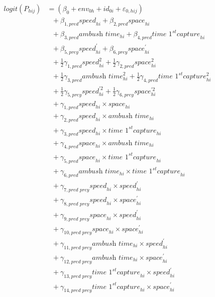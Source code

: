 \documentclass[
  11pt,
]{article}
\begin{document}
\[
\begin{aligned}
logit (P_{hij}) &= (\beta_{0} + env_{0h} + id_{0i} + \varepsilon_{0,hij}) \\
&\text{ } + \beta_{1,pred} \textit{speed}_{hi} + \beta_{2,pred} \textit{space}_{hi} \\
&\text{ } + \beta_{3,pred} \textit{ambush time}_{hi} + \beta_{4,pred} \textit{time 1}^{st} \textit{capture}_{hi} \\
&\text{ } + \beta_{5,prey} \textit{speed}_{hi}^{'} + \beta_{6,prey} \textit{space}_{hi}^{'} \\
&\text{ } + \frac{1}{2} \gamma_{1,pred} \textit{speed}_{hi}^{2} + \frac{1}{2} \gamma_{2,pred} \textit{space}_{hi}^{2} \\
&\text{ } + \frac{1}{2} \gamma_{3,pred} \textit{ambush time}_{hi}^{2} + \frac{1}{2} \gamma_{4,pred} \textit{time 1}^{st} \textit{capture}_{hi}^{2} \\
&\text{ } + \frac{1}{2} \gamma_{5,prey} \textit{speed}_{hi}^{'2} + \frac{1}{2} \gamma_{6,prey} \textit{space}_{hi}^{'2} \\
&\text{ } + \gamma_{1,pred}\textit{speed}_{hi} \times \textit{space}_{hi} \\
&\text{ } + \gamma_{2,pred}\textit{speed}_{hi} \times \textit{ambush time}_{hi} \\ 
&\text{ } + \gamma_{3,pred}\textit{speed}_{hi} \times \textit{time 1}^{st} \textit{capture}_{hi} \\
&\text{ } + \gamma_{4,pred}\textit{space}_{hi} \times \textit{ambush time}_{hi} \\
&\text{ } + \gamma_{5,pred}\textit{space}_{hi} \times \textit{time 1}^{st} \textit{capture}_{hi} \\
&\text{ } + \gamma_{6,pred}\textit{ambush time}_{hi} \times \textit{time 1}^{st} \textit{capture}_{hi} \\
&\text{ } + \gamma_{7,\textit{pred prey}}\textit{speed}_{hi} \times \textit{speed}_{hi}^{'} \\
&\text{ } + \gamma_{8,\textit{pred prey}}\textit{speed}_{hi} \times \textit{space}_{hi}^{'} \\
&\text{ } + \gamma_{9,\textit{pred prey}}\textit{space}_{hi} \times \textit{speed}_{hi}^{'} \\
&\text{ } + \gamma_{10,\textit{pred prey}}\textit{space}_{hi} \times \textit{space}_{hi}^{'} \\
&\text{ } + \gamma_{11,\textit{pred prey}}\textit{ambush time}_{hi} \times \textit{speed}_{hi}^{'} \\
&\text{ } + \gamma_{12,\textit{pred prey}}\textit{ambush time}_{hi} \times \textit{space}_{hi}^{'} \\
&\text{ } + \gamma_{13,\textit{pred prey}}\textit{time 1}^{st} \textit{capture}_{hi} \times \textit{speed}_{hi}^{'} \\
&\text{ } + \gamma_{14,\textit{pred prey}}\textit{time 1}^{st} \textit{capture}_{hi} \times \textit{space}_{hi}^{'} \\
\end{aligned}
\tag{S8}
\]
\end{document}
